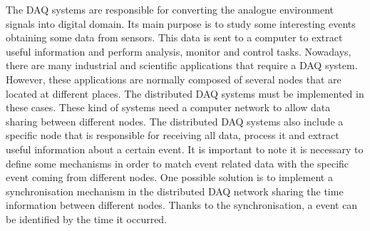 The DAQ \cite{daq:book1} systems are responsible for converting the analogue environment signals into digital domain. Its main purpose is to study some interesting events obtaining some data from sensors. This data is sent to a computer to extract useful information and perform analysis, monitor and control tasks. Nowadays, there are many industrial \cite{daq:res} and scientific applications \cite{daq:sensor-networks} that require a DAQ system. However, these applications are normally composed of several nodes that are located at different places. The distributed DAQ systems must be implemented in these cases. These kind of systems need a computer network to allow data sharing between different nodes. The distributed DAQ systems also include a specific node that is responsible for receiving all data, process it and extract useful information about a certain event. It is important to note it is necessary to define some mechanisms in order to match event related data with the specific event coming from different nodes. One possible solution is to implement a synchronisation mechanism in the distributed DAQ network sharing the time information between different nodes. Thanks to the synchronisation, a event can be identified by the time it occurred.


